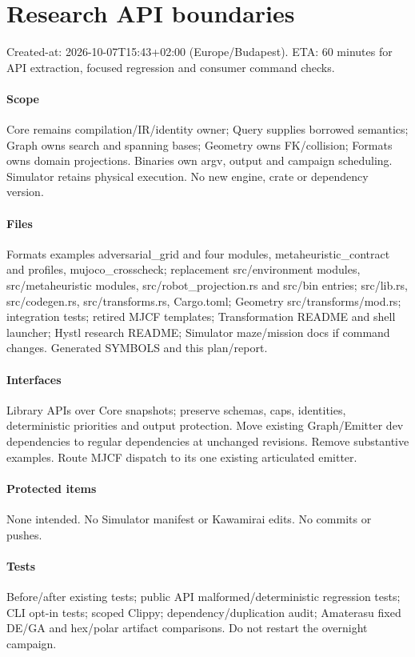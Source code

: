 \documentclass{article}
\begin{document}
\section*{Research API boundaries}
Created-at: 2026-10-07T15:43+02:00 (Europe/Budapest). ETA: 60 minutes for API extraction, focused regression and consumer command checks.
\paragraph{Scope} Core remains compilation/IR/identity owner; Query supplies borrowed semantics; Graph owns search and spanning bases; Geometry owns FK/collision; Formats owns domain projections. Binaries own argv, output and campaign scheduling. Simulator retains physical execution. No new engine, crate or dependency version.

\paragraph{Files} Formats examples adversarial\_grid and four modules, metaheuristic\_contract and profiles, mujoco\_crosscheck; replacement src/environment modules, src/metaheuristic modules, src/robot\_projection.rs and src/bin entries; src/lib.rs, src/codegen.rs, src/transforms.rs, Cargo.toml; Geometry src/transforms/mod.rs; integration tests; retired MJCF templates; Transformation README and shell launcher; Hystl research README; Simulator maze/mission docs if command changes. Generated SYMBOLS and this plan/report.
\paragraph{Interfaces} Library APIs over Core snapshots; preserve schemas, caps, identities, deterministic priorities and output protection. Move existing Graph/Emitter dev dependencies to regular dependencies at unchanged revisions. Remove substantive examples. Route MJCF dispatch to its one existing articulated emitter.
\paragraph{Protected items} None intended. No Simulator manifest or Kawamirai edits. No commits or pushes.
\paragraph{Tests} Before/after existing tests; public API malformed/deterministic regression tests; CLI opt-in tests; scoped Clippy; dependency/duplication audit; Amaterasu fixed DE/GA and hex/polar artifact comparisons. Do not restart the overnight campaign.
\end{document}
